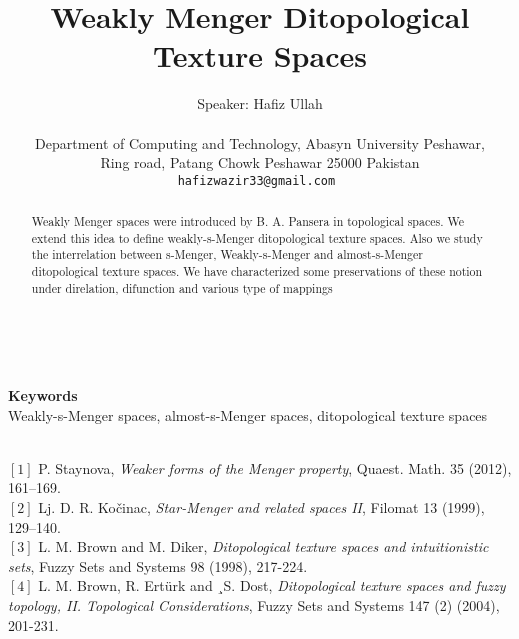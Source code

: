 \documentclass[a4paper]{article} %
\date{} %
\def\keywords#1{\begin{center}{\bf Keywords}\\{#1}\end{center}} %
\begin{document}
\title{Weakly Menger Ditopological Texture Spaces}

\author{Speaker: Hafiz Ullah \\ %
\\
       Department of Computing and Technology, Abasyn University Peshawar, \\ Ring road, Patang Chowk Peshawar 25000 Pakistan\\ %
       \tt{hafizwazir33@gmail.com} %
       }%


\maketitle

\thispagestyle{empty}

\\
\begin{abstract}
Weakly Menger spaces were introduced by B. A. Pansera in topological spaces. We extend this idea to define weakly-s-Menger ditopological texture spaces. Also we study the interrelation between s-Menger, Weakly-s-Menger and almost-s-Menger ditopological texture spaces. We have characterized some preservations of these notion under direlation, difunction and various type of mappings

\end{abstract}

\keywords{Weakly-s-Menger spaces, almost-s-Menger spaces, ditopological texture spaces} %


{\begin{small}
\\
$[1]$ P. Staynova, \emph{Weaker forms of the Menger property}, Quaest. Math. 35 (2012), 161–169.\\ %
$[2]$ Lj. D. R. Ko\v{c}inac, \emph{Star-Menger and related spaces II}, Filomat 13 (1999), 129–140.\\ %
$[3]$ L. M. Brown and M. Diker, \emph{Ditopological texture spaces and intuitionistic sets}, Fuzzy Sets and Systems 98 (1998), 217-224.\\
$[4]$ L. M. Brown, R. Ertürk and ¸S. Dost, \emph{Ditopological texture spaces and fuzzy topology, II. Topological Considerations}, Fuzzy Sets and Systems 147 (2) (2004), 201-231. %
\end{small}}



\end{document}
